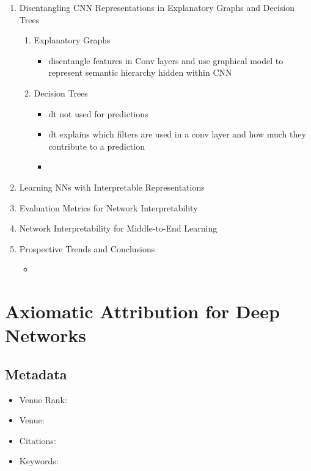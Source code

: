 \documentclass{article}
\begin{document}
\begin{enumerate}
\begin{itemize}
\begin{enumerate}
		\end{enumerate}
	\end{itemize}
	\item Disentangling CNN Representations in Explanatory Graphs and Decision Trees
	\begin{enumerate}
		\item Explanatory Graphs
		\begin{itemize}
			\item disentangle features in Conv layers and use graphical model to represent semantic hierarchy hidden within CNN
		\end{itemize}
		\item Decision Trees
		\begin{itemize}
			\item dt not used for predictions
			\item dt explains which filters are used in a conv layer and how much they contribute to a prediction
		\end{itemize}
		\begin{itemize}
			\item 
		\end{itemize}
	\end{enumerate}
	\item Learning NNs with Interpretable Representations
	\item Evaluation Metrics for Network Interpretability
	\item Network Interpretability for Middle-to-End Learning
	\item Prospective Trends and Conclusions
	\begin{itemize}
		\item 
	\end{itemize}
\end{enumerate}

\pagebreak


\section*{Axiomatic Attribution for Deep Networks}

\subsection*{Metadata}
\begin{itemize}
	\item Venue Rank:
	\item Venue:
	\item Citations: 
	\item Keywords: 
\end{itemize}
\end{document}
